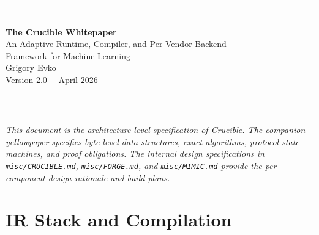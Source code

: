 \documentclass[11pt, a4paper]{article}
\theoremstyle{definition}
\theoremstyle{plain}
\theoremstyle{remark}
\begin{document}
\begin{titlepage}
\begin{center}
  \vspace*{2em}
  {\color{rulegray}\rule{\textwidth}{1.2pt}}\\[1.5em]
  {\fontsize{26}{30}\selectfont\sffamily\bfseries The Crucible Whitepaper}\\[0.8em]
  {\Large\sffamily An Adaptive Runtime, Compiler, and Per-Vendor Backend\\[0.15em] Framework for Machine Learning}\\[2em]
  {\normalsize Grigory Evko}\\[0.3em]
  {\small\textcolor{black!45}{Version 2.0 \quad---\quad April 2026}}\\[1.5em]
  {\color{rulegray}\rule{\textwidth}{1.2pt}}\\[2em]
\end{center}

\noindent\textit{This document is the architecture-level specification of Crucible.
The companion yellowpaper specifies byte-level data structures, exact algorithms, protocol state machines, and proof obligations.
The internal design specifications in \texttt{misc/CRUCIBLE.md}, \texttt{misc/FORGE.md}, and \texttt{misc/MIMIC.md} provide the per-component design rationale and build plans.}
\end{titlepage}

\thispagestyle{empty}
\tableofcontents

\newpage


% 
% 
% 

% 
% 
% 

\part{IR Stack and Compilation}





\end{document}
